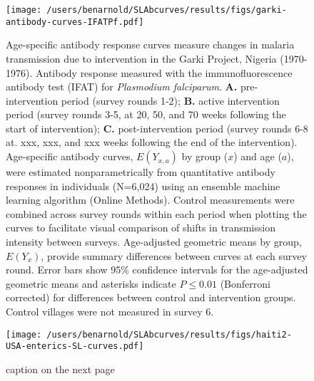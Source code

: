 \documentclass[11pt]{article}
\begin{document}
\begin{figure}[htbp]
\begin{center}
\texttt{[image: /users/benarnold/SLAbcurves/results/figs/garki-antibody-curves-IFATPf.pdf]}
\begin{minipage}{\textwidth}
\caption{Age-specific antibody response curves measure changes in malaria transmission due to intervention in the Garki Project, Nigeria (1970-1976). Antibody response measured with the immunofluorescence antibody test (IFAT) for \textit{Plasmodium falciparum}. \textbf{A.} pre-intervention period (survey rounds 1-2); \textbf{B.} active intervention period (survey rounds 3-5, at 20, 50, and 70 weeks following the start of intervention); \textbf{C.} post-intervention period (survey rounds 6-8 at. xxx, xxx, and xxx weeks following the end of the intervention).  Age-specific antibody curves, $E(Y_{x,a})$ by group ($x$) and age ($a$), were estimated nonparametrically from quantitative antibody responses in individuals (N=6,024) using an ensemble machine learning algorithm (Online Methods). Control measurements were combined across survey rounds within each period when plotting the curves to facilitate visual comparison of shifts in transmission intensity between surveys. Age-adjusted geometric means by group, $E(Y_x)$, provide summary differences between curves at each survey round. Error bars show 95\% confidence intervals for the age-adjusted geometric means and asterisks indicate $P\leq0.01$ (Bonferroni corrected) for differences between control and intervention groups. Control villages were not measured in survey 6.  }
\label{fig:garki}
\end{minipage}
\end{center}
\end{figure}


\begin{figure}[htbp]
\begin{center}
\texttt{[image: /users/benarnold/SLAbcurves/results/figs/haiti2-USA-enterics-SL-curves.pdf]}
\begin{minipage}{\textwidth}
\caption{caption on the next page}
\label{fig:enterics}
\end{minipage}
\end{center}
\end{figure}
\end{document}
